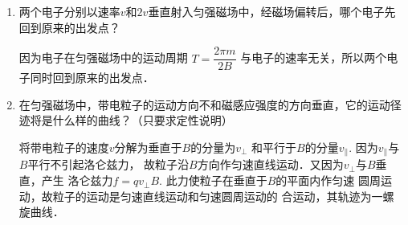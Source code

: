 \begin{enumerate}
    \item 两个电子分别以速率$v$和$2v$垂直射入匀强磁场中，经磁场偏转后，哪个电子先回到原来的出发点？


    \begin{solution}
        因为电子在匀强磁场中的运动周期
        $T=\dfrac{2\pi m}{2B}$
        与电子的速率无关，所以两个电子同时回到原来的出发点．
    \end{solution}
    
    \item 在匀强磁场中，带电粒子的运动方向不和磁感应强度的方向垂直，它的运动径迹将是什么样的曲线？（只要求定性说明）


    \begin{solution}
        将带电粒子的速度$v$分解为垂直于$B$的分量为$v_{\bot}$
        和平行于$B$的分量$v_{\parallel}$. 因为$v_{\parallel}$与$B$平行不引起洛仑兹力，
        故粒子沿$B$方向作匀速直线运动．又因为$v_{\bot}$与$B$垂直，产生
        洛仑兹力$f=qv_{\bot}B$. 此力使粒子在垂直于$B$的平面内作匀速
        圆周运动，故粒子的运动是匀速直线运动和匀速圆周运动的
        合运动，其轨迹为一螺旋曲线．
    \end{solution}
    
\end{enumerate}







